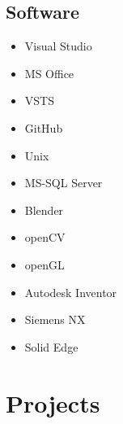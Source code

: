 \documentclass[letterpaper]{twentysecondcv} %
\begin{document}
\subsection{Software}

\begin{multicols}{3}
\begin{itemize}
    \item Visual Studio
    \item MS Office
    \item VSTS
    \item GitHub
    \item Unix
    \item MS-SQL Server
    \item Blender
    \item openCV
    \item openGL
    \item Autodesk Inventor
    \item Siemens NX
    \item Solid Edge
\end{itemize}
\end{multicols}


\newpage %

\makeprofile %

\section{Projects}
\end{document}
